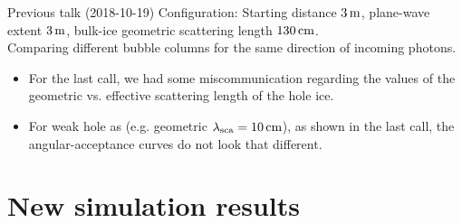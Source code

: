 \begin{frame}[fragile]{Previous talk (2018-10-19)}
  \tiny Configuration: Starting distance $3\text{\,m}$, plane-wave extent $3\text{\,m}$, bulk-ice geometric scattering length $130\text{\,cm}$. \\
  Comparing different bubble columns for the same direction of incoming photons.
  \normalsize

  \begin{itemize}
    \item For the last call, we had some miscommunication regarding the values of the geometric vs. effective scattering length of the hole ice.
    \item For weak hole as (e.g. geometric $\lambda_\text{sca} = 10\text{\,cm}$), as shown in the last call, the angular-acceptance curves do not look that different.
  \end{itemize}

\end{frame}

\section{New simulation results}
